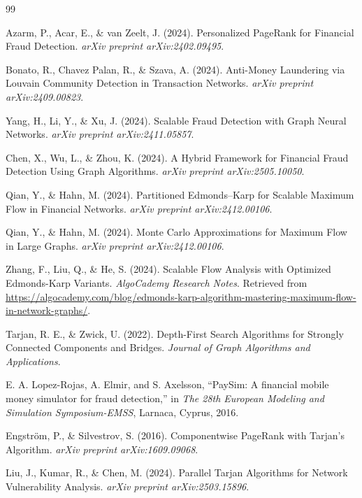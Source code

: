 \documentclass[lettersize,journal]{IEEEtran}
\begin{document}
\begin{thebibliography}{99}

 Azarm, P., Acar, E., \& van Zeelt, J. (2024). Personalized PageRank for Financial Fraud Detection. \textit{arXiv preprint arXiv:2402.09495}.

 Bonato, R., Chavez Palan, R., \& Szava, A. (2024). Anti-Money Laundering via Louvain Community Detection in Transaction Networks. \textit{arXiv preprint arXiv:2409.00823}.

 Yang, H., Li, Y., \& Xu, J. (2024). Scalable Fraud Detection with Graph Neural Networks. \textit{arXiv preprint arXiv:2411.05857}.

 Chen, X., Wu, L., \& Zhou, K. (2024). A Hybrid Framework for Financial Fraud Detection Using Graph Algorithms. \textit{arXiv preprint arXiv:2505.10050}.

 Qian, Y., \& Hahn, M. (2024). Partitioned Edmonds–Karp for Scalable Maximum Flow in Financial Networks. \textit{arXiv preprint arXiv:2412.00106}.

 Qian, Y., \& Hahn, M. (2024). Monte Carlo Approximations for Maximum Flow in Large Graphs. \textit{arXiv preprint arXiv:2412.00106}.

 Zhang, F., Liu, Q., \& He, S. (2024). Scalable Flow Analysis with Optimized Edmonds-Karp Variants. \textit{AlgoCademy Research Notes}. Retrieved from \url{https://algocademy.com/blog/edmonds-karp-algorithm-mastering-maximum-flow-in-network-graphs/}.

 Tarjan, R. E., \& Zwick, U. (2022). Depth-First Search Algorithms for Strongly Connected Components and Bridges. \textit{Journal of Graph Algorithms and Applications}.

 E. A. Lopez-Rojas, A. Elmir, and S. Axelsson, ``PaySim: A financial mobile money simulator for fraud detection,'' in \textit{The 28th European Modeling and Simulation Symposium-EMSS}, Larnaca, Cyprus, 2016.

 Engström, P., \& Silvestrov, S. (2016). Componentwise PageRank with Tarjan’s Algorithm. \textit{arXiv preprint arXiv:1609.09068}.

 Liu, J., Kumar, R., \& Chen, M. (2024). Parallel Tarjan Algorithms for Network Vulnerability Analysis. \textit{arXiv preprint arXiv:2503.15896}.


\end{thebibliography}
\end{document}
